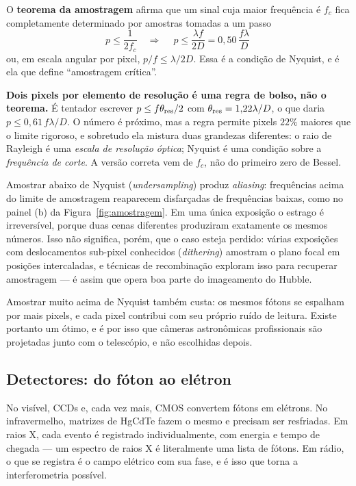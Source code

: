 \documentclass[11pt,a4paper]{article}
\begin{document}
O \textbf{teorema da amostragem} afirma que um sinal cuja maior frequência é $f_c$ fica completamente determinado
por amostras tomadas a um passo
\[
p\le\frac{1}{2f_c}
\quad\Longrightarrow\quad
\boxed{\ p\le\frac{\lambda f}{2D}=0{,}50\,\frac{f\lambda}{D}\ }
\]
ou, em escala angular por pixel, $p/f\le\lambda/2D$. Essa é a condição de Nyquist, e é ela que define
``amostragem crítica''.

\begin{noticebox}
\textbf{Dois pixels por elemento de resolução é uma regra de bolso, não o teorema.} É tentador escrever
$p\le f\theta_{\rm res}/2$ com $\theta_{\rm res}=1{,}22\lambda/D$, o que daria $p\le0{,}61\,f\lambda/D$. O número
é próximo, mas a regra permite pixels $22\%$ maiores que o limite rigoroso, e sobretudo ela mistura duas
grandezas diferentes: o raio de Rayleigh é uma \emph{escala de resolução óptica}; Nyquist é uma condição sobre a
\emph{frequência de corte}. A versão correta vem de $f_c$, não do primeiro zero de Bessel.
\end{noticebox}

Amostrar abaixo de Nyquist (\textit{undersampling}) produz \textit{aliasing}: frequências acima do limite de
amostragem reaparecem disfarçadas de frequências baixas, como no painel (b) da Figura~\ref{fig:amostragem}. Em
uma única exposição o estrago é irreversível, porque duas cenas diferentes produziram exatamente os mesmos
números. Isso não significa, porém, que o caso esteja perdido: várias exposições com deslocamentos sub-pixel
conhecidos (\textit{dithering}) amostram o plano focal em posições intercaladas, e técnicas de recombinação
exploram isso para recuperar amostragem --- é assim que opera boa parte do imageamento do Hubble.

Amostrar muito acima de Nyquist também custa: os mesmos fótons se espalham por mais pixels, e cada pixel
contribui com seu próprio ruído de leitura. Existe portanto um ótimo, e é por isso que câmeras astronômicas
profissionais são projetadas junto com o telescópio, e não escolhidas depois.

\subsection*{Detectores: do fóton ao elétron}

No visível, CCDs e, cada vez mais, CMOS convertem fótons em elétrons. No infravermelho, matrizes de HgCdTe fazem
o mesmo e precisam ser resfriadas. Em raios X, cada evento é registrado individualmente, com energia e tempo de
chegada --- um espectro de raios X é literalmente uma lista de fótons. Em rádio, o que se registra é o campo
elétrico com sua fase, e é isso que torna a interferometria possível.
\end{document}
